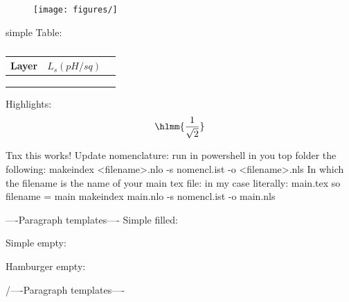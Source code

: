 \begin{figure}[ht]
	\centering
	\texttt{[image: figures/]}
	\caption{}
	\label{fig:}
\end{figure}

simple Table:
\begin{table}[ht]
    \centering
    \begin{tabular}[t]{lcc}
    \toprule
    Layer & $ L_{s} (pH/sq) $ \\
    \midrule
    & \\
    & \\
    & \\
    \bottomrule
    \end{tabular}
    \caption{}
    \label{tab:}
\end{table}%

Highlights:
\begin{equation}
    \hlmm{\frac{1}{\sqrt{2}}}
\end{equation}



Tnx this works!
Update nomenclature: 
run in powershell in you top folder the following:
makeindex <filename>.nlo -s nomencl.ist -o <filename>.nls
In which the filename is the name of your main tex file: 
in my case literally: main.tex
so filename = main
makeindex main.nlo -s nomencl.ist -o main.nls

----Paragraph templates----
Simple filled:

Simple empty:

Hamburger empty:

/----Paragraph templates----



